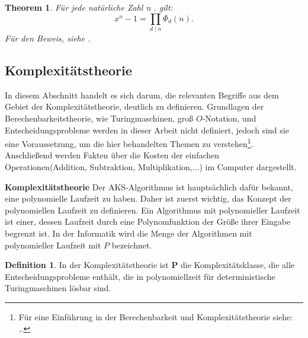 \documentclass[12pt,oneside]{article}
\newtheorem{theorem}{Theorem}[section]
\theoremstyle{remark}
\theoremstyle{definition}
\newtheorem{definition}{Definition}[section]
\begin{document}
\smallskip

\begin{theorem}\label{impor_cyc_lemma}
Für jede natürliche Zahl n . gilt:\newline
\begin{equation}
    x^n - 1 = \prod_{d \mid n} \Phi_{d}(n).
\end{equation}
Für den Beweis, siehe \cite{cyclo}. 
\end{theorem}

\smallskip



\smallskip





\subsection{Komplexitätstheorie}

In diesem Abschnitt handelt es sich darum, die relevanten Begriffe aus dem Gebiet der Komplexitätstheorie, deutlich zu definieren. Grundlagen der Berechenbarkeitstheorie, wie Turingmaschinen, groß $O$-Notation, und Entscheidungsprobleme werden in dieser Arbeit nicht definiert, jedoch sind sie eine Voraussetzung, um die hier behandelten Themen zu verstehen\footnote{Für eine Einführung in der Berechenbarkeit und Komplexitätstheorie siehe: \cite{comp-compx},\cite{com-theory}.}. Anschließend werden Fakten über die Kosten der einfachen Operationen(Addition, Subtraktion, Multiplikation,...) im Computer dargestellt.\newline  

\textbf{\normalsize{Komplexitätstheorie}}\newline
Der AKS-Algorithmus ist hauptsächlich dafür bekannt, eine polynomielle Laufzeit zu haben. Daher ist zuerst wichtig, das Konzept der polynomiellen Laufzeit zu definieren. Ein Algorithmus mit polynomieller Laufzeit ist einer, dessen Laufzeit durch eine Polynomfunktion der Größe ihrer Eingabe begrenzt ist. In der Informatik wird die Menge der Algorithmen mit polynomieller Laufzeit mit $P$ bezeichnet.

\begin{definition}
In der Komplexitätstheorie ist \textbf{P} die Komplexitätsklasse, die alle Entscheidungsprobleme enthält, die in polynomiellzeit für deterministische Turingmaschinen lösbar sind. 
\end{definition}
\end{document}
